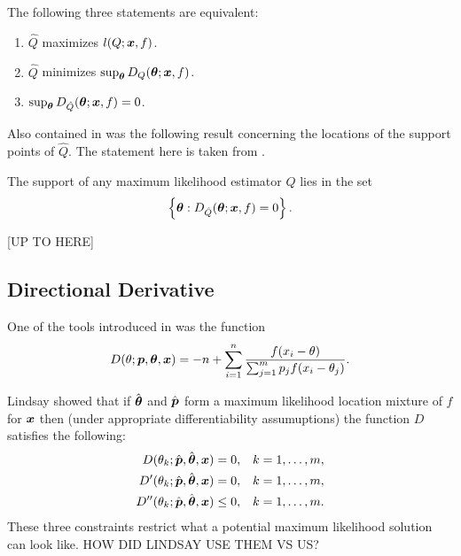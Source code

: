 	\begin{theorem}
		The following three statements are equivalent:
		\begin{enumerate}
			\item $\hat{Q}$ maximizes $l(Q;{\bm{{x}}},f)$.
			\item $\hat{Q}$ minimizes $\sup_{\bm{{\theta}}} D_Q({\bm{{\theta}}};{\bm{{x}}}, f)$.
			\item $\sup_{\bm{{\theta}}} D_{\hat{Q}}({\bm{{\theta}}};{\bm{{x}}}, f) = 0$.
		\end{enumerate}
	\end{theorem}

	Also contained in \cite[Theorem 4.1]{Lindsay1983-tf} was the following result concerning the locations of the support points of $\hat{Q}$. The statement here is taken from \cite[Theorem 20]{Lindsay1995-sq}.

	\begin{theorem}
		The support of any maximum likelihood estimator $\hat{Q}$ lies in the set 
		\begin{equation}
			\left\{{\bm{{\theta}}} : D_{\hat{Q}}({\bm{{\theta}}};{\bm{{x}}},f) = 0 \right\}.
		\end{equation}
	\end{theorem}

	[UP TO HERE]

	\subsection{Directional Derivative}
		One of the tools introduced in \cite{Lindsay1983-tf} was the function
		\begin{equation}
			D(\theta;{\bm{{p}}},{\bm{{\theta}}},{\bm{{x}}}) = -n + \sum_{i=1}^n \frac{f(x_i - \theta)}{\sum_{j=1}^m p_j f(x_i - \theta_j)}.
		\end{equation}

		Lindsay showed that if $\hat{{\bm{{\theta}}}}$ and $\hat{{\bm{{p}}}}$ form a maximum likelihood location mixture of $f$ for ${\bm{{x}}}$ then (under appropriate differentiability assumuptions) the function $D$ satisfies the following:
		\begin{align}
			D(\theta_k;\hat{{\bm{{p}}}},\hat{{\bm{{\theta}}}},{\bm{{x}}}) &= 0, && k = 1,\dots,m,
			\label{eq:Deq1}\\
			D'(\theta_k;\hat{{\bm{{p}}}},\hat{{\bm{{\theta}}}},{\bm{{x}}}) &= 0, && k = 1,\dots,m,
			\label{eq:Deq2}\\
			D''(\theta_k;\hat{{\bm{{p}}}},\hat{{\bm{{\theta}}}},{\bm{{x}}}) &\leq 0, && k = 1,\dots,m.
			\label{eq:Deq3}
		\end{align}
		These three constraints restrict what a potential maximum likelihood solution can look like.
		HOW DID LINDSAY USE THEM VS US?


